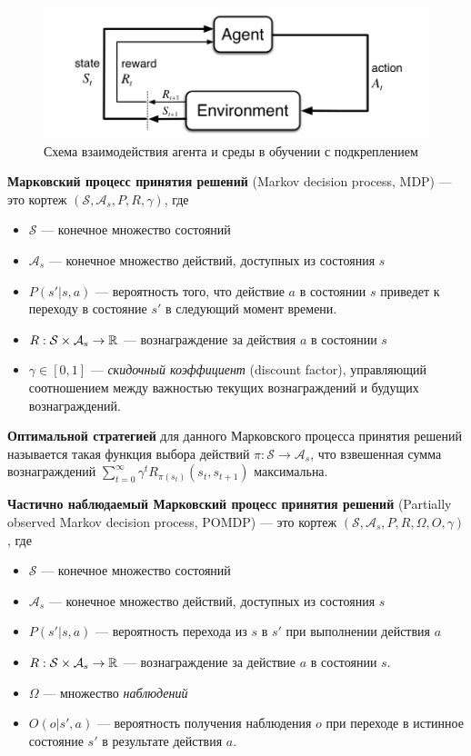 \documentclass[specification, annotation]{itmo-student-thesis}
\begin{document}
\begin{figure}[!h]
  \caption{Схема взаимодействия агента и среды в обучении с подкреплением}\label{rl-scheme}
  \centering
  \includegraphics[scale=0.5]{rl-scheme}
\end{figure}

\textbf{Марковский процесс принятия решений} (Markov decision process, MDP) ---
это кортеж
$(\mathcal{S}, \mathcal{A}_s, P, R, \gamma)$, где

\begin{itemize}
\item $\mathcal{S}$ --- конечное множество состояний
\item $\mathcal{A}_s$ --- конечное множество действий, доступных из состояния
  $s$
\item $P(s' | s, a)$ --- вероятность того, что действие $a$ в состоянии $s$
  приведет к переходу в состояние $s'$ в следующий момент времени.
\item $R : \mathcal{S} \times \mathcal{A}_s \rightarrow \Bbb{R}$ ---
  вознаграждение за действия $a$ в состоянии $s$
\item $\gamma \in [0, 1]$ --- \textit{скидочный коэффициент} (discount factor),
  управляющий соотношением между важностью текущих вознаграждений и будущих вознаграждений.
\end{itemize}

\textbf{Оптимальной стратегией} для данного Марковского процесса принятия
решений называется такая функция выбора действий $\pi : \mathcal{S} \rightarrow \mathcal{A}_s$,
что взвешенная сумма вознаграждений $\sum\limits_{t=0}^{\infty} {\gamma^t
  R_{\pi(s_t)}(s_t, s_{t+1})}$ максимальна.

\textbf{Частично наблюдаемый Марковский процесс принятия решений} (Partially
observed Markov decision process, POMDP) --- это кортеж
$(\mathcal{S}, \mathcal{A}_s, P, R, \Omega, O, \gamma)$, где
\begin{itemize}
\item $\mathcal{S}$ --- конечное множество состояний
\item $\mathcal{A}_s$ --- конечное множество действий, доступных из состояния $s$
\item $P(s' | s, a)$ --- вероятность перехода из $s$ в $s'$ при выполнении
  действия $a$
\item $R : \mathcal{S} \times \mathcal{A}_s \rightarrow \Bbb{R}$ ---
  вознаграждение за действие $a$ в состоянии $s$.
\item $\Omega$ --- множество \textit{наблюдений}
\item $O(o | s', a)$ --- вероятность получения наблюдения $o$ при переходе в
  истинное состояние $s'$ в результате действия $a$. 
\end{itemize}
\end{document}
